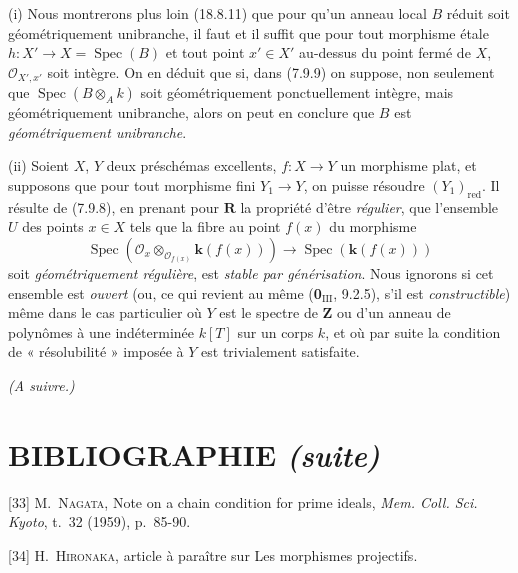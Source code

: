 \begin{remarks}[7.9.10]
\label{IV.2.s7.9.10-fr}
(i) Nous montrerons plus loin (18.8.11) que pour qu'un anneau local $B$ réduit
soit géométriquement unibranche, il faut et il suffit que pour tout morphisme
étale $h:X'\to X=\operatorname{Spec}(B)$ et tout point $x'\in X'$ au-dessus
du point fermé de $X$, $\mathcal O_{X',x'}$ soit intègre. On en déduit que si,
dans (7.9.9) on suppose, non seulement que
$\operatorname{Spec}(B\otimes_Ak)$ soit géométriquement ponctuellement
intègre, mais géométriquement unibranche, alors on peut en conclure que $B$ est
\emph{géométriquement unibranche}.


(ii) Soient $X$, $Y$ deux préschémas excellents, $f:X\to Y$ un morphisme
plat, et supposons que pour tout morphisme fini $Y_1\to Y$, on puisse résoudre
$(Y_1)_{\mathrm{red}}$. Il résulte de (7.9.8), en prenant pour
$\boldsymbol R$ la propriété d'être \emph{régulier}, que l'ensemble $U$ des points
$x\in X$ tels que la fibre au point $f(x)$ du morphisme
\[
\operatorname{Spec}(\mathcal O_x\otimes_{\mathcal O_{f(x)}}\boldsymbol{k}(f(x)))
\longrightarrow\operatorname{Spec}(\boldsymbol{k}(f(x)))
\]
soit \emph{géométriquement régulière}, est \emph{stable par générisation}. Nous ignorons si
cet ensemble est \emph{ouvert} (ou, ce qui revient au même (\textbf{0}$_{\mathrm{III}}$,
9.2.5), s'il est \emph{constructible}) même dans le cas particulier où $Y$ est le
spectre de $\mathbf Z$ ou d'un anneau de polynômes à une indéterminée $k[T]$
sur un corps $k$, et où par suite la condition de « résolubilité » imposée à
$Y$ est trivialement satisfaite.
\end{remarks}

\begin{center}
\emph{(A suivre.)}
\end{center}

\clearpage
{}
{}
\section*{BIBLIOGRAPHIE \textnormal{\emph{(suite)}}}

\begingroup
\small
\setlength{\parindent}{0pt}
\setlength{\parskip}{4pt}

[33] M.~\textsc{Nagata}, Note on a chain condition for prime
ideals, \emph{Mem. Coll. Sci. Kyoto}, t.~32 (1959), p.~85-90.

[34] H.~\textsc{Hironaka}, article à paraître sur Les morphismes
projectifs.

